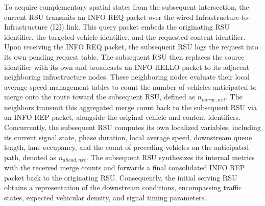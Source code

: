 \documentclass[journal]{IEEEtran}
\begin{document}
To acquire complementary spatial states from the subsequent intersection, the current RSU transmits an INFO REQ packet over the wired Infrastructure-to-Infrastructure (I2I) link.
This query packet embeds the originating RSU identifier, the targeted vehicle identifier, and the requested content identifier.
Upon receiving the INFO REQ packet, the subsequent RSU logs the request into its own pending request table.
The subsequent RSU then replaces the source identifier with its own and broadcasts an INFO HELLO packet to its adjacent neighboring infrastructure nodes.
These neighboring nodes evaluate their local average speed management tables to count the number of vehicles anticipated to merge onto the route toward the subsequent RSU, defined as $n_{merge,nxt}$.
The neighbors transmit this aggregated merge count back to the subsequent RSU via an INFO REP packet, alongside the original vehicle and content identifiers.
Concurrently, the subsequent RSU computes its own localized variables, including its current signal state, phase duration, local average speed, downstream queue length, lane occupancy, and the count of preceding vehicles on the anticipated path, denoted as $n_{ahead,nxt}$.
The subsequent RSU synthesizes its internal metrics with the received merge counts and forwards a final consolidated INFO REP packet back to the originating RSU.
Consequently, the initial serving RSU obtains a representation of the downstream conditions, encompassing traffic states, expected vehicular density, and signal timing parameters.
\end{document}

